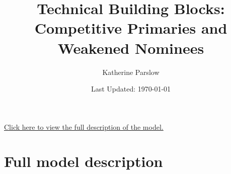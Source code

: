 

\title{Technical Building Blocks: Competitive Primaries and Weakened Nominees}
\author{Katherine Parslow}
\date{Last Updated: \today}


\maketitle

\tableofcontents



\noindent\hyperref[sec:full_model]{Click here to view the full description of the model.}











\clearpage
\section{Full model description}\label{sec:full_model}



